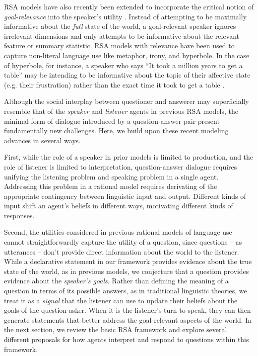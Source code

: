 \documentclass[12pt, floatsintext, jou]{apa6}
\begin{document}
RSA models have also recently been extended to incorporate the critical notion of \emph{goal-relevance} into the speaker's utility \cite{Roberts96_InformationStructureDiscourse, WilsonSperber12_MeaningRelevance}. 
Instead of attempting to be maximally informative about the \emph{full} state of the world, a goal-relevant speaker ignores irrelevant dimensions and only attempts to be informative about the relevant feature or summary statistic. 
RSA models with relevance have been used to capture non-literal language use like metaphor, irony, and hyperbole. 
In the case of hyperbole, for instance, a speaker who says ``It took a million years to get a table'' may be intending to be informative about the topic of their affective state (e.g. their frustration) rather than the exact time it took to get a table \cite{KaoWuBergenGoodman14_NonliteralNumberWords}.

Although the social interplay between questioner and answerer may superficially resemble that of the \emph{speaker} and \emph{listener} agents in previous RSA models, the minimal form of dialogue introduced by a question-answer pair present fundamentally new challenges.
Here, we build upon these recent modeling advances in several ways. 

First, while the role of a speaker in prior models is limited to production, and the role of listener is limited to interpretation, question-answer dialogue requires unifying the listening problem and speaking problem in a single agent. 
Addressing this problem in a rational model requires derivating of the appropriate contingency between linguistic input and output.
Different kinds of input shift an agent's beliefs in different ways, motivating different kinds of responses. 

Second, the utilities considered in previous rational models of language use cannot straightforwardly capture the utility of a question, since questions -- as utterances -- don't provide direct information about the world to the listener.
While a declarative statement in our framework provides evidence about the true state of the world, as in previous models, we conjecture that a question provides evidence about the \emph{speaker's goals}. 
Rather than defining the meaning of a question in terms of its possible answers, as in traditional linguistic theories, we treat it as a \emph{signal} that the listener can use to update their beliefs about the goals of the question-asker. 
When it is the listener's turn to speak, they can then generate statements that better address the goal-relevant aspects of the world. 
In the next section, we review the basic RSA framework and explore several different proposals for how agents interpret and respond to questions within this framework.
\end{document}
